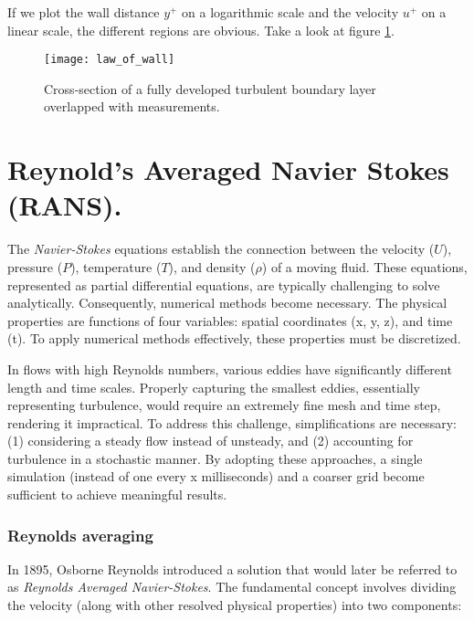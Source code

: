 If we plot the wall distance $y^{+}$ on a logarithmic scale and the velocity
$u^{+}$ on a linear scale, the different regions are obvious. Take a look at
figure \ref{fig:law_of_wall}.

\begin{figure}[H] \centering
\texttt{[image: law\_of\_wall]}
    \caption{Cross-section of a fully developed turbulent boundary layer
             overlapped with measurements\cite{Schlichting2018}.}
    \label{fig:law_of_wall}
\end{figure}








\section{Reynold's Averaged Navier Stokes (RANS).}
The \textit{Navier-Stokes} equations establish the connection between the
velocity ($U$), pressure ($P$), temperature ($T$), and density ($\rho$) of a
moving fluid. These equations, represented as partial differential equations,
are typically challenging to solve analytically. Consequently, numerical
methods become necessary. The physical properties are functions of four
variables: spatial coordinates (x, y, z), and time (t). To apply numerical
methods effectively, these properties must be discretized. \cite{nasaNS}

In flows with high Reynolds numbers, various eddies have significantly
different length and time scales. Properly capturing the smallest eddies,
essentially representing turbulence, would require an extremely fine mesh and
time step, rendering it impractical. To address this challenge, simplifications
are necessary: (1) considering a steady flow instead of unsteady, and (2)
accounting for turbulence in a stochastic manner. By adopting these approaches,
a single simulation (instead of one every x milliseconds) and a coarser grid
become sufficient to achieve meaningful results.


\subsubsection{Reynolds averaging}
In 1895, Osborne Reynolds introduced a solution that would later be referred to
as \textit{Reynolds Averaged Navier-Stokes}. The fundamental concept involves
dividing the velocity (along with other resolved physical properties) into two
components: \cite{leschziner2015statistical}

